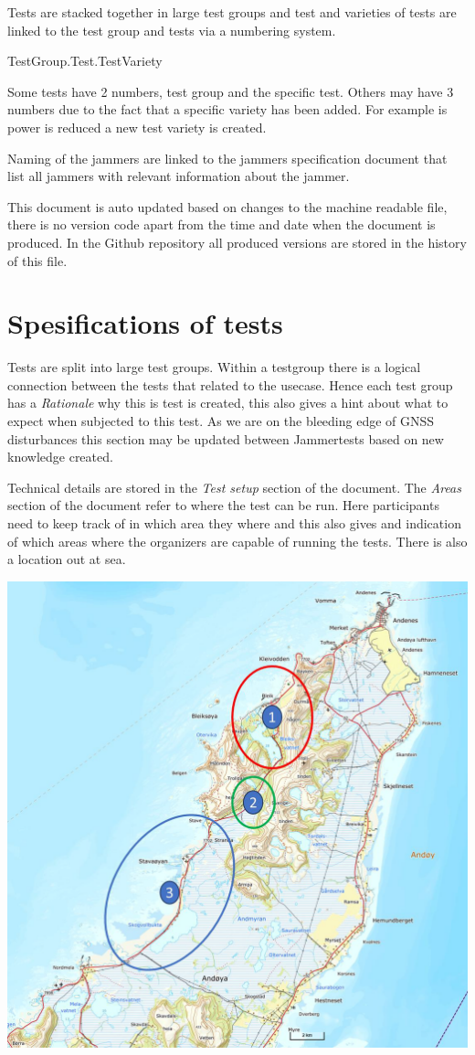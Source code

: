 \documentclass{book}
\begin{document}
Tests are stacked together in large test groups and test and varieties of tests are linked to the test group and tests via a numbering system.

TestGroup.Test.TestVariety

Some tests have 2 numbers, test group and the specific test. Others may have 3 numbers due to the fact that a specific variety has been added. For example is power is reduced a new test variety is created.


Naming of the jammers are linked to the jammers specification document that list all jammers with relevant information about the jammer.

This document is auto updated based on changes to the machine readable file, there is no version code apart from the time and date when the document is produced. In the Github repository all produced versions are stored in the history of this file.

\section{Spesifications of tests}
Tests are split into large test groups. Within a testgroup there is a logical connection between the tests that related to the usecase. Hence each test group has a \textit{Rationale} why this is test is created, this also gives a hint about what to expect when subjected to this test. As we are on the bleeding edge of GNSS disturbances this section may be updated between Jammertests based on new knowledge created. 

Technical details are stored in the \textit{Test setup} section of the document. The \textit{Areas} section of the document refer to where the test can be run. Here participants need to keep track of in which area they where and this also gives and indication of which areas where the organizers are capable of running the tests. There is also a location out at sea.

\includegraphics[scale=0.4]{locations.png}
\end{document}
